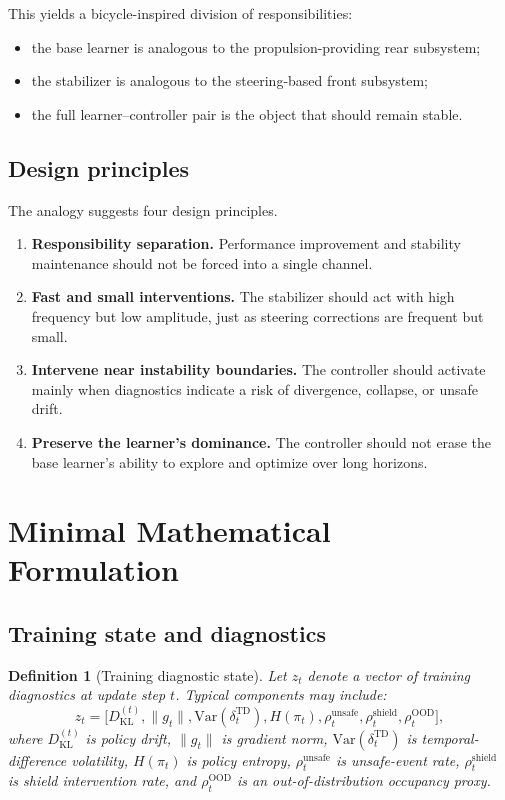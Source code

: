 \documentclass[11pt]{article}
\newtheorem{definition}{Definition}
\begin{document}
This yields a bicycle-inspired division of responsibilities:
\begin{itemize}[leftmargin=1.5em]
    \item the base learner is analogous to the propulsion-providing rear subsystem;
    \item the stabilizer is analogous to the steering-based front subsystem;
    \item the full learner--controller pair is the object that should remain stable.
\end{itemize}

\subsection{Design principles}

The analogy suggests four design principles.

\begin{enumerate}[leftmargin=1.5em]
    \item \textbf{Responsibility separation.} Performance improvement and stability maintenance should not be forced into a single channel.
    \item \textbf{Fast and small interventions.} The stabilizer should act with high frequency but low amplitude, just as steering corrections are frequent but small.
    \item \textbf{Intervene near instability boundaries.} The controller should activate mainly when diagnostics indicate a risk of divergence, collapse, or unsafe drift.
    \item \textbf{Preserve the learner's dominance.} The controller should not erase the base learner's ability to explore and optimize over long horizons.
\end{enumerate}

\section{Minimal Mathematical Formulation}

\subsection{Training state and diagnostics}

\begin{definition}[Training diagnostic state]
Let $z_t$ denote a vector of training diagnostics at update step $t$. Typical components may include:
\begin{equation}
z_t =
\bigl[
D_{\mathrm{KL}}^{(t)},
\|g_t\|,
\mathrm{Var}(\delta_t^{\mathrm{TD}}),
H(\pi_t),
\rho_t^{\mathrm{unsafe}},
\rho_t^{\mathrm{shield}},
\rho_t^{\mathrm{OOD}}
\bigr],
\end{equation}
where $D_{\mathrm{KL}}^{(t)}$ is policy drift, $\|g_t\|$ is gradient norm, $\mathrm{Var}(\delta_t^{\mathrm{TD}})$ is temporal-difference volatility, $H(\pi_t)$ is policy entropy, $\rho_t^{\mathrm{unsafe}}$ is unsafe-event rate, $\rho_t^{\mathrm{shield}}$ is shield intervention rate, and $\rho_t^{\mathrm{OOD}}$ is an out-of-distribution occupancy proxy.
\end{definition}
\end{document}
